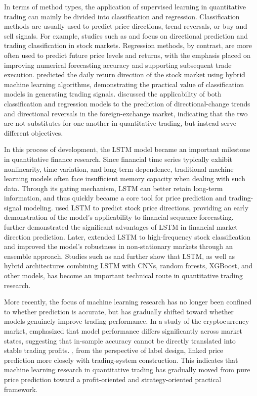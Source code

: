 \documentclass[12pt]{article}
\begin{document}
In terms of method types, the application of supervised learning in quantitative trading can 
mainly be divided into classification and regression. Classification methods are usually used 
to predict price directions, trend reversals, or buy and sell signals. For example, studies such 
as \citet{ShenJiangZhang2012} and \citet{GerleinEtAl2016} focus on directional prediction and 
trading classification in stock markets. Regression methods, by contrast, are more often used 
to predict future price levels and returns, with the emphasis placed on improving numerical 
forecasting accuracy and supporting subsequent trade execution. \citet{ZhongEnke2019} predicted 
the daily return direction of the stock market using hybrid machine learning algorithms, 
demonstrating the practical value of classification models in generating trading signals. 
\citet{AdegboyeKampouridis2021} discussed the applicability of both classification and 
regression models to the prediction of directional-change trends and directional reversals in 
the foreign-exchange market, indicating that the two are not substitutes for one another in 
quantitative trading, but instead serve different objectives.

In this process of development, the LSTM model became an important milestone in quantitative 
finance research. Since financial time series typically exhibit nonlinearity, time variation, 
and long-term dependence, traditional machine learning models often face insufficient memory 
capacity when dealing with such data. Through its gating mechanism, LSTM can better retain 
long-term information, and thus quickly became a core tool for price prediction and 
trading-signal modeling. \citet{NelsonPereiraDeOliveira2017} used LSTM to predict stock price 
directions, providing an early demonstration of the model's applicability to financial sequence 
forecasting. \citet{FischerKrauss2018} further demonstrated the significant advantages of LSTM 
in financial market direction prediction. Later, \citet{BorovkovaTsiamas2019} extended LSTM to 
high-frequency stock classification and improved the model's robustness in non-stationary 
markets through an ensemble approach. Studies such as \citet{MehtabSenDutta2020} and 
\citet{GhoshEtAl2022} further show that LSTM, as well as hybrid architectures combining LSTM 
with CNNs, random forests, XGBoost, and other models, has become an important technical route 
in quantitative trading research.

More recently, the focus of machine learning research has no longer been confined to whether 
prediction is accurate, but has gradually shifted toward whether models genuinely improve 
trading performance. In a study of the cryptocurrency market, \citet{SebastiaoGodinho2021} 
emphasized that model performance differs significantly across market states, suggesting that 
in-sample accuracy cannot be directly translated into stable trading profits. 
\citet{HanKimEnke2023}, from the perspective of label design, linked price prediction more 
closely with trading-system construction. This indicates that machine learning research in 
quantitative trading has gradually moved from pure price prediction toward a profit-oriented 
and strategy-oriented practical framework.
\end{document}
